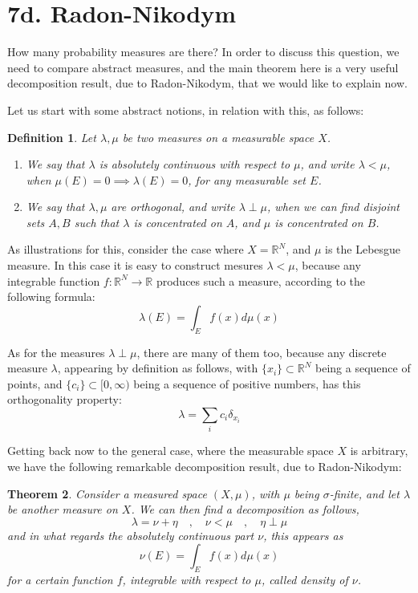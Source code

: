 \documentclass[12pt]{amsbook}
\newtheorem{theorem}{Theorem}[chapter]
\newtheorem{definition}[theorem]{Definition}
\begin{document}
\section*{7d. Radon-Nikodym}

How many probability measures are there? In order to discuss this question, we need to compare abstract measures, and the main theorem here is a very useful decomposition result, due to Radon-Nikodym, that we would like to explain now. 

\bigskip

Let us start with some abstract notions, in relation with this, as follows:


\begin{definition}
Let $\lambda,\mu$ be two measures on a measurable space $X$.
\begin{enumerate}
\item We say that $\lambda$ is absolutely continuous with respect to $\mu$, and write $\lambda<\mu$, when $\mu(E)=0\implies\lambda(E)=0$, for any measurable set $E$.

\item We say that $\lambda,\mu$ are orthogonal, and write $\lambda\perp\mu$, when we can find disjoint sets $A,B$ such that $\lambda$ is concentrated on $A$, and $\mu$ is concentrated on $B$.
\end{enumerate}
\end{definition}

As illustrations for this, consider the case where $X=\mathbb R^N$, and $\mu$ is the Lebesgue measure. In this case it is easy to construct mesures $\lambda<\mu$, because any integrable function $f:\mathbb R^N\to\mathbb R$ produces such a measure, according to the following formula:
$$\lambda(E)=\int_Ef(x)d\mu(x)$$

As for the measures $\lambda\perp\mu$, there are many of them too, because any discrete measure $\lambda$, appearing by definition as follows, with $\{x_i\}\subset\mathbb R^N$ being a sequence of points, and $\{c_i\}\subset[0,\infty)$ being a sequence of positive numbers, has this orthogonality property:
$$\lambda=\sum_ic_i\delta_{x_i}$$

Getting back now to the general case, where the measurable space $X$ is arbitrary, we have the following remarkable decomposition result, due to Radon-Nikodym:


\begin{theorem}
Consider a measured space $(X,\mu)$, with $\mu$ being $\sigma$-finite, and let $\lambda$ be another measure on $X$. We can then find a decomposition as follows,
$$\lambda=\nu+\eta\quad,\quad\nu<\mu\quad,\quad\eta\perp\mu$$
and in what regards the absolutely continuous part $\nu$, this appears as
$$\nu(E)=\int_Ef(x)d\mu(x)$$
for a certain function $f$, integrable with respect to $\mu$, called density of $\nu$.
\end{theorem}
\end{document}

